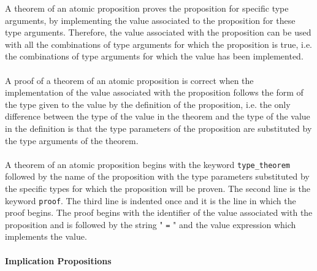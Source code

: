 \documentclass{article}
\begin{document}
\begin{itemize}
A theorem of an atomic proposition proves the proposition for
specific type arguments, by implementing the value associated to the
proposition for these type arguments. Therefore, the value associated with the
proposition can be used with all the combinations of type arguments for which
the proposition is true, i.e. the combinations of type arguments for which
the value has been implemented.
\\\\
A proof of a theorem of an atomic proposition is correct when the
implementation of the value associated with the proposition follows the form of
the type given to the value by the definition of the proposition, i.e. the only
difference between the type of the value in the theorem and the type of the
value in the definition is that the type parameters of the proposition are
substituted by the type arguments of the theorem.
\\\\
A theorem of an atomic proposition begins with the keyword
\texttt{type_theorem} followed by the name of the proposition with the type
parameters substituted by the specific types for which the proposition will be
proven. The second line is the keyword \texttt{proof}. The third line is
indented once and it is the line in which the proof begins. The proof begins
with the identifier of the value associated with the proposition and is followed
by the string " \texttt{=} " and the value expression which implements the value.

\end{itemize}

\paragraph{Implication Propositions}
\end{document}
